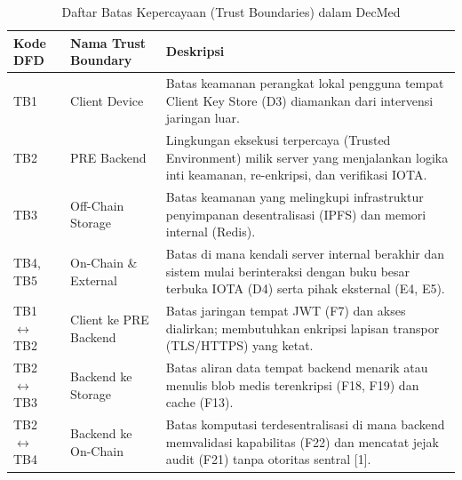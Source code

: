 \begin{table}[htbp]
    \centering
    \caption{Daftar Batas Kepercayaan (Trust Boundaries) dalam DecMed}
    \vspace{0.25cm}
    \label{tab:trust-boundaries}
    \begin{tabular}{|p{2.5cm}|p{3.5cm}|p{8cm}|}
        \hline
        \textbf{Kode DFD} & \textbf{Nama Trust Boundary} & \textbf{Deskripsi} \\
        \hline
        TB1 & Client Device & Batas keamanan perangkat lokal pengguna tempat Client Key Store (D3) diamankan dari intervensi jaringan luar. \\
        \hline
        TB2 & PRE Backend & Lingkungan eksekusi terpercaya (Trusted Environment) milik server yang menjalankan logika inti keamanan, re-enkripsi, dan verifikasi IOTA. \\
        \hline
        TB3 & Off-Chain Storage & Batas keamanan yang melingkupi infrastruktur penyimpanan desentralisasi (IPFS) dan memori internal (Redis). \\
        \hline
        TB4, TB5 & On-Chain \& External & Batas di mana kendali server internal berakhir dan sistem mulai berinteraksi dengan buku besar terbuka IOTA (D4) serta pihak eksternal (E4, E5). \\
        \hline
        TB1 $\leftrightarrow$ TB2 & Client ke PRE Backend & Batas jaringan tempat JWT (F7) dan akses dialirkan; membutuhkan enkripsi lapisan transpor (TLS/HTTPS) yang ketat. \\
        \hline
        TB2 $\leftrightarrow$ TB3 & Backend ke Storage & Batas aliran data tempat backend menarik atau menulis blob medis terenkripsi (F18, F19) dan cache (F13). \\
        \hline
        TB2 $\leftrightarrow$ TB4 & Backend ke On-Chain & Batas komputasi terdesentralisasi di mana backend memvalidasi kapabilitas (F22) dan mencatat jejak audit (F21) tanpa otoritas sentral [1]. \\
        \hline
    \end{tabular}
\end{table}